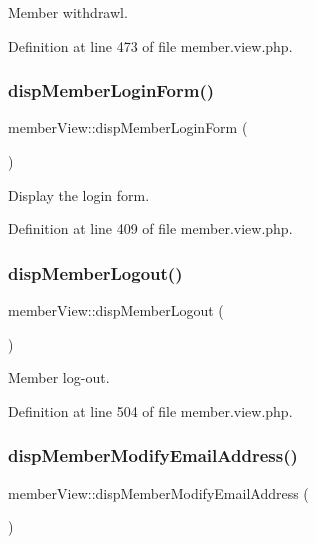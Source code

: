 Member withdrawl. 



Definition at line 473 of file member.\+view.\+php.

\mbox{\label{classmemberView_a8406fab6cecc89c49479a61ddffe18cc}} 
\subsubsection{\texorpdfstring{disp\+Member\+Login\+Form()}{dispMemberLoginForm()}}
{\footnotesize\ttfamily member\+View\+::disp\+Member\+Login\+Form (\begin{DoxyParamCaption}{ }\end{DoxyParamCaption})}



Display the login form. 



Definition at line 409 of file member.\+view.\+php.

\mbox{\label{classmemberView_a97280f922b67896898bd34f5c2ddc411}} 
\subsubsection{\texorpdfstring{disp\+Member\+Logout()}{dispMemberLogout()}}
{\footnotesize\ttfamily member\+View\+::disp\+Member\+Logout (\begin{DoxyParamCaption}{ }\end{DoxyParamCaption})}



Member log-\/out. 



Definition at line 504 of file member.\+view.\+php.

\mbox{\label{classmemberView_ac89f9f6436c7d195835d091960f5d113}} 
\subsubsection{\texorpdfstring{disp\+Member\+Modify\+Email\+Address()}{dispMemberModifyEmailAddress()}}
{\footnotesize\ttfamily member\+View\+::disp\+Member\+Modify\+Email\+Address (\begin{DoxyParamCaption}{ }\end{DoxyParamCaption})}



